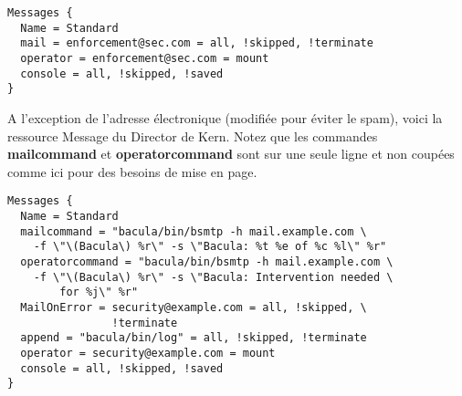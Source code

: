 \footnotesize
\begin{verbatim}
Messages {
  Name = Standard
  mail = enforcement@sec.com = all, !skipped, !terminate
  operator = enforcement@sec.com = mount
  console = all, !skipped, !saved
}
\end{verbatim}
\normalsize

A l'exception de l'adresse \'electronique (modifi\'ee pour \'eviter le spam), 
voici la ressource Message du Director de Kern. Notez que les commandes 
{\bf mailcommand} et {\bf operatorcommand} sont sur une seule ligne et 
non coup\'ees comme ici pour des besoins de mise en page.

\footnotesize
\begin{verbatim}
Messages {
  Name = Standard
  mailcommand = "bacula/bin/bsmtp -h mail.example.com \
    -f \"\(Bacula\) %r\" -s \"Bacula: %t %e of %c %l\" %r"
  operatorcommand = "bacula/bin/bsmtp -h mail.example.com \
    -f \"\(Bacula\) %r\" -s \"Bacula: Intervention needed \
        for %j\" %r"
  MailOnError = security@example.com = all, !skipped, \
                !terminate
  append = "bacula/bin/log" = all, !skipped, !terminate
  operator = security@example.com = mount
  console = all, !skipped, !saved
}
\end{verbatim}
\normalsize
